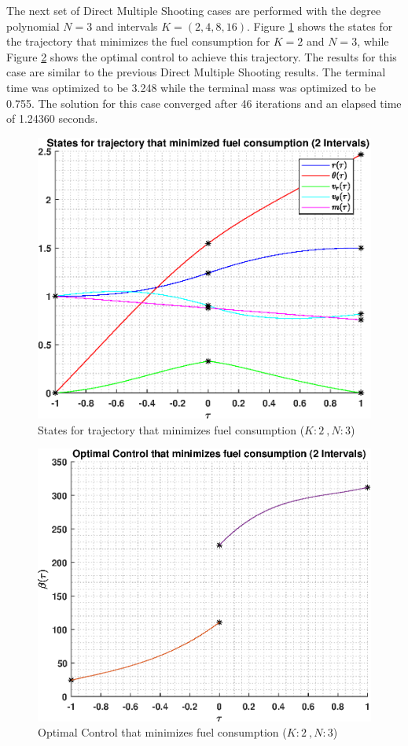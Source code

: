 \documentclass[]{article}
\begin{document}
The next set of Direct Multiple Shooting cases are performed with the degree polynomial \(N = 3\) and intervals \(K = (2,4,8,16)\). Figure \ref{fig:directStatesK2Poly3} shows the states for the trajectory that minimizes the fuel consumption for \(K = 2\) and  \(N = 3\), while Figure \ref{fig:directControlK2Poly3} shows the optimal control to achieve this trajectory. The results for this case are similar to the previous Direct Multiple Shooting results. The terminal time was optimized to be 3.248 while the terminal mass was optimized to be 0.755. The solution for this case converged after 46 iterations and an elapsed time of 1.24360 seconds.
\begin{figure}
	\centering
	\includegraphics[scale=0.75]{directStatesK2Poly3.eps}
	\caption{States for trajectory that minimizes fuel consumption (\(K:2\ , N:3\))}
	\label{fig:directStatesK2Poly3}
\end{figure}
\begin{figure}
	\centering
	\includegraphics[scale=0.75]{directControlK2Poly3.eps}
	\caption{Optimal Control that minimizes fuel consumption (\(K:2\ , N:3\))}
	\label{fig:directControlK2Poly3}
\end{figure}
\FloatBarrier
\end{document}
